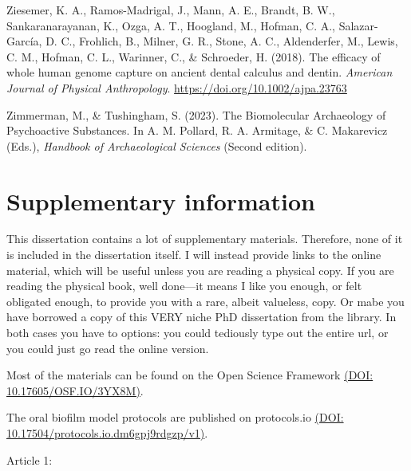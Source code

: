 \documentclass[
  b5paper,
]{book}
\newlength{\cslhangindent}
\newenvironment{CSLReferences}[2] %
 {\begin{list}{}{%
  \setlength{\itemindent}{0pt}
  \setlength{\leftmargin}{0pt}
  \setlength{\parsep}{0pt}
  \ifodd #1
   \setlength{\leftmargin}{\cslhangindent}
   \setlength{\itemindent}{-1\cslhangindent}
  \fi
  \setlength{\itemsep}{#2\baselineskip}}}
 {\end{list}}
\begin{document}
\begin{CSLReferences}{1}{0}
Ziesemer, K. A., Ramos-Madrigal, J., Mann, A. E., Brandt, B. W.,
Sankaranarayanan, K., Ozga, A. T., Hoogland, M., Hofman, C. A.,
Salazar-García, D. C., Frohlich, B., Milner, G. R., Stone, A. C.,
Aldenderfer, M., Lewis, C. M., Hofman, C. L., Warinner, C., \&
Schroeder, H. (2018). The efficacy of whole human genome capture on
ancient dental calculus and dentin. \emph{American Journal of Physical
Anthropology}. \url{https://doi.org/10.1002/ajpa.23763}

Zimmerman, M., \& Tushingham, S. (2023). The {Biomolecular Archaeology}
of {Psychoactive Substances}. In A. M. Pollard, R. A. Armitage, \& C.
Makarevicz (Eds.), \emph{Handbook of {Archaeological Sciences}} (Second
edition).

\end{CSLReferences}

\label{supplementary-information}

\chapter*{Supplementary information}


This dissertation contains a lot of supplementary materials. Therefore,
none of it is included in the dissertation itself. I will instead
provide links to the online material, which will be useful unless you
are reading a physical copy. If you are reading the physical book, well
done---it means I like you enough, or felt obligated enough, to provide
you with a rare, albeit valueless, copy. Or mabe you have borrowed a
copy of this VERY niche PhD dissertation from the library. In both cases
you have to options: you could tediously type out the entire url, or you
could just go read the online version.

Most of the materials can be found on the Open Science Framework
\href{https://doi.org/10.17605/OSF.IO/3YX8M}{(DOI:
10.17605/OSF.IO/3YX8M)}.

The oral biofilm model protocols are published on protocols.io
\href{https://dx.doi.org/10.17504/protocols.io.dm6gpj9rdgzp/v1}{(DOI:
10.17504/protocols.io.dm6gpj9rdgzp/v1)}.

Article 1:
\end{document}
